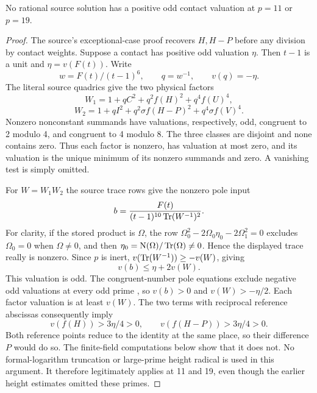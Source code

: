\documentclass[11pt,a4paper]{article}
\begin{document}
\begin{lemma}\label{lem:inert}
No rational source solution has a positive odd contact valuation at
$p=11$ or $p=19$.
\end{lemma}
\begin{proof}
The source's exceptional-case proof recovers $H,H-P$ before any division
by contact weights. Suppose a contact has positive odd valuation $\eta$.
Then $t-1$ is a unit and $\eta=v(F(t))$. Write
\[
 w=F(t)/(t-1)^6,\qquad q=w^{-1},\qquad v(q)=-\eta.
\]
The literal source quadrics give the two physical factors
\[
 W_1=1+qC^2+q^2 f(H)^2+q^4 f(U)^4,
\]
\[
 W_2=1+qI^2+q^2\sigma f(H-P)^2+q^4\sigma f(V)^4.
\]
Nonzero nonconstant summands have valuations, respectively, odd,
congruent to 2 modulo 4, and congruent to 4 modulo 8. The three classes
are disjoint and none contains zero. Thus each factor is nonzero, has
valuation at most zero, and its valuation is the unique minimum of its
nonzero summands and zero. A vanishing test is simply omitted.

For $W=W_1W_2$ the source trace rows give the nonzero pole input
\[
 b=\frac{F(t)}{(t-1)^{10}\operatorname{Tr}(W^{-1})^2}.
\]
For clarity, if the stored product is $\Omega$, the row
$\Omega_0^2-2\Omega_0\eta_0-2\Omega_1^2=0$ excludes $\Omega_0=0$
when $\Omega\ne0$, and then
$\eta_0=\operatorname{N}(\Omega)/\operatorname{Tr}(\Omega)\ne0$.
Hence the displayed trace really is nonzero. Since $p$ is inert,
$v(\operatorname{Tr}(W^{-1}))\ge-v(W)$, giving
\[
                       v(b)\le\eta+2v(W).
\]
This valuation is odd. The congruent-number pole equations exclude negative
odd valuations at every odd prime \cite{Pole}, so $v(b)>0$ and
$v(W)>-\eta/2$. Each factor valuation is at least $v(W)$.
The two terms with reciprocal reference abscissas consequently imply
\[
 v(f(H))>3\eta/4>0,\qquad v(f(H-P))>3\eta/4>0.
\]
Both reference points reduce to the identity at the same place, so their
difference $P$ would do so. The finite-field computations below show that
it does not. No formal-logarithm truncation or large-prime height radical
is used in this argument. It therefore legitimately applies at 11 and 19,
even though the earlier height estimates omitted these primes.
\end{proof}
\end{document}
